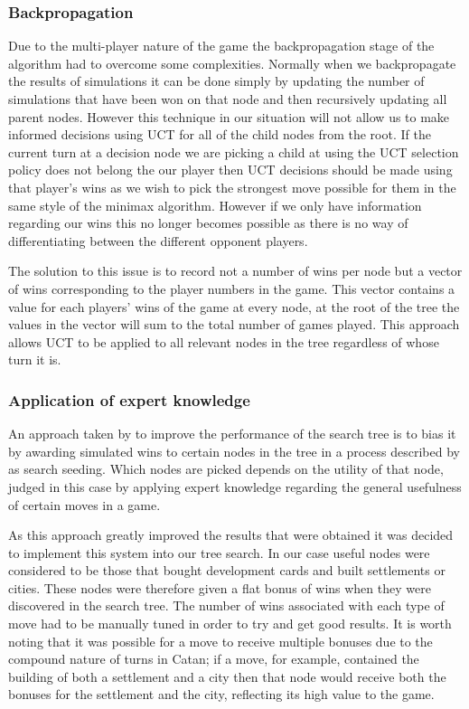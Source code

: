 \documentclass[]{article}
\begin{document}
\subsubsection{Backpropagation}
Due to the multi-player nature of the game the backpropagation stage of the algorithm had to overcome some complexities. Normally when we backpropagate the results of simulations it can be done simply by updating the number of simulations that have been won on that node and then recursively updating all parent nodes. However this technique in our situation will not allow us to make informed decisions using UCT for all of the child nodes from the root. If the current turn at a decision node we are picking a child at using the UCT selection policy does not belong the our player then UCT decisions should be made using that player's wins as we wish to pick the strongest move possible for them in the same style of the minimax algorithm. However if we only have information regarding our wins this no longer becomes possible as there is no way of differentiating between the different opponent players.

\par The solution to this issue is to record not a number of wins per node but a vector of wins corresponding to the player numbers in the game. This vector contains a value for each players' wins of the game at every node, at the root of the tree the values in the vector will sum to the total number of games played. This approach allows UCT to be applied to all relevant nodes in the tree regardless of whose turn it is.

\subsubsection{Application of expert knowledge}
An approach taken by \textcite{szita2009monte} to improve the performance of the search tree is to bias it by awarding simulated wins to certain nodes in the tree in a process described by \textcite{browne2012survey} as search seeding. Which nodes are picked depends on the utility of that node, judged in this case by applying expert knowledge regarding the general usefulness of certain moves in a game. 

\par As this approach greatly improved the results that were obtained it was decided to implement this system into our tree search. In our case useful nodes were considered to be those that bought development cards and built settlements or cities. These nodes were therefore given a flat bonus of wins when they were discovered in the search tree. The number of wins associated with each type of move had to be manually tuned in order to try and get good results. It is worth noting that it was possible for a move to receive multiple bonuses due to the compound nature of turns in Catan; if a move, for example, contained the building of both a settlement and a city then that node would receive both the bonuses for the settlement and the city, reflecting its high value to the game.    
\end{document}
